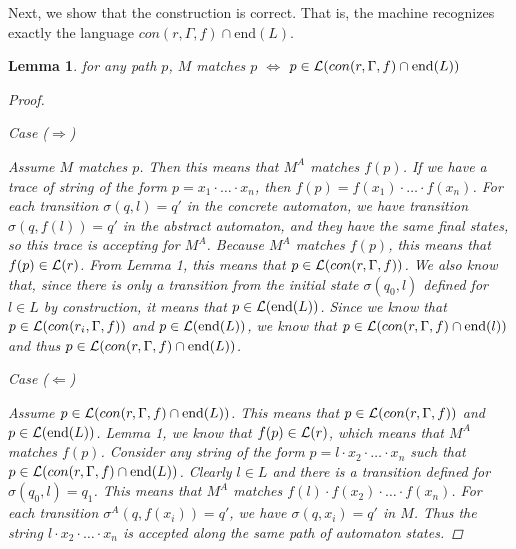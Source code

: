 \documentclass[twocolumn, openany]{sig-alternate-10pt}
\newcommand{\EndR}{\ensuremath{\mathrm{end}}}
\newtheorem{lem}[thm]{Lemma}
\begin{document}
Next, we show that the construction is correct. That is, the machine recognizes exactly the language $con(r,\Gamma, f) \cap \EndR(L)$.

\begin{lem}
  for any path $p$, $M$ matches $p$ $\iff$ $p \in \Lang(con(r,\Gamma, f) \cap \EndR(L))$
  \begin{proof} 
    $ $
    \vspace{1em}

    \emph{Case} ($\Rightarrow$)

    Assume $M$ matches $p$. Then this means that $M^A$ matches $f(p)$. If we have a trace of string of the form $ p = x_1 \cdot \dots \cdot x_n$, then $f(p) = f(x_1) \cdot \dots \cdot f(x_n)$. For each transition $\sigma(q,l) = q'$ in the concrete automaton, we have transition $\sigma(q,f(l)) = q'$ in the abstract automaton, and they have the same final states, so this trace is accepting for $M^A$. Because $M^A$ matches $f(p)$, this means that $f(p) \in \mathcal{L}(r)$. From Lemma 1, this means that $p \in \mathcal{L}(con(r,\Gamma,f))$. We also know that, since there is only a transition from the initial state $\sigma(q_0,l)$ defined for $l \in L$ by construction, it means that $p \in \mathcal{L}(\text{end}(L))$. Since we know that $p \in \mathcal{L}(con(r_i,\Gamma,f))$ and $p \in \mathcal{L}(\text{end}(L))$, we know that $p \in \mathcal{L}(con(r,\Gamma,f) \cap \text{end}(l))$ and thus $p \in \Lang(con(r,\Gamma, f) \cap \EndR(L))$.

    \vspace{1em}
    \emph{Case} ($\Leftarrow$)

    Assume $p \in \Lang(con(r,\Gamma, f) \cap \EndR(L))$. This means that $p \in \mathcal{L}(con(r,\Gamma,f))$ and $p \in \mathcal{L}(\text{end}(L))$. Lemma 1, we know that $f(p) \in \mathcal{L}(r)$, which means that $M^A$ matches $f(p)$. 
    Consider any string of the form $p = l \cdot x_2 \cdot \dots \cdot x_n$ such that $p \in \mathcal{L}(con(r,\Gamma,f) \cap \text{end}(L))$. Clearly $l \in L$ and there is a transition defined for $\sigma(q_0,l) = q_1$.
    This means that $M^A$ matches $f(l) \cdot f(x_2) \cdot \dots \cdot f(x_n)$.
    For each transition $\sigma^A(q,f(x_i)) = q'$, we have $\sigma(q,x_i) = q'$ in $M$.
    Thus the string $l \cdot x_2 \cdot \dots \cdot x_n$ is accepted along the same path of automaton states.
  \end{proof}

\end{lem}
\end{document}
